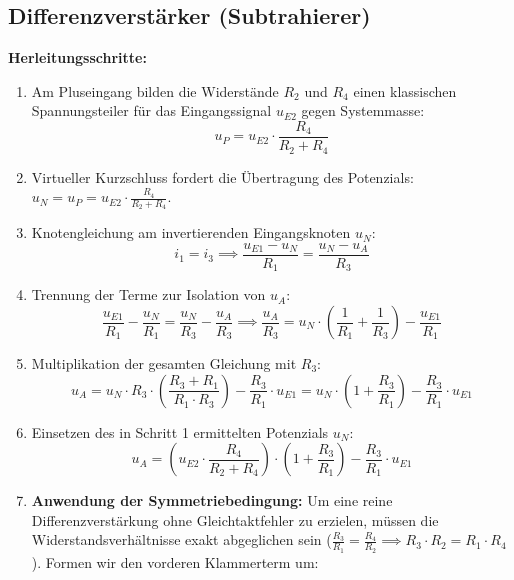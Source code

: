 \documentclass[11pt,a4paper]{article}
\begin{document}
\subsection{Differenzverstärker (Subtrahierer)}
\textbf{Herleitungsschritte:}
\begin{enumerate}
    \item Am Pluseingang bilden die Widerstände $R_2$ und $R_4$ einen klassischen Spannungsteiler für das Eingangssignal $u_{E2}$ gegen Systemmasse:
    \begin{equation}
    u_P = u_{E2} \cdot \frac{R_4}{R_2 + R_4}
    \end{equation}
    \item Virtueller Kurzschluss fordert die Übertragung des Potenzials: $u_N = u_P = u_{E2} \cdot \frac{R_4}{R_2 + R_4}$.
    \item Knotengleichung am invertierenden Eingangsknoten $u_N$:
    \begin{equation}
    i_1 = i_3 \implies \frac{u_{E1} - u_N}{R_1} = \frac{u_N - u_A}{R_3}
    \end{equation}
    \item Trennung der Terme zur Isolation von $u_A$:
    \begin{equation}
    \frac{u_{E1}}{R_1} - \frac{u_N}{R_1} = \frac{u_N}{R_3} - \frac{u_A}{R_3} \implies \frac{u_A}{R_3} = u_N \cdot \left( \frac{1}{R_1} + \frac{1}{R_3} \right) - \frac{u_{E1}}{R_1}
    \end{equation}
    \item Multiplikation der gesamten Gleichung mit $R_3$:
    \begin{equation}
    u_A = u_N \cdot R_3 \cdot \left( \frac{R_3 + R_1}{R_1 \cdot R_3} \right) - \frac{R_3}{R_1} \cdot u_{E1} = u_N \cdot \left( 1 + \frac{R_3}{R_1} \right) - \frac{R_3}{R_1} \cdot u_{E1}
    \end{equation}
    \item Einsetzen des in Schritt 1 ermittelten Potenzials $u_N$:
    \begin{equation}
    u_A = \left( u_{E2} \cdot \frac{R_4}{R_2 + R_4} \right) \cdot \left( 1 + \frac{R_3}{R_1} \right) - \frac{R_3}{R_1} \cdot u_{E1}
    \end{equation}
    \item \textbf{Anwendung der Symmetriebedingung:} Um eine reine Differenzverstärkung ohne Gleichtaktfehler zu erzielen, müssen die Widerstandsverhältnisse exakt abgeglichen sein ($\frac{R_3}{R_1} = \frac{R_4}{R_2} \implies R_3 \cdot R_2 = R_1 \cdot R_4$). Formen wir den vorderen Klammerterm um:

\end{enumerate}
\end{document}
